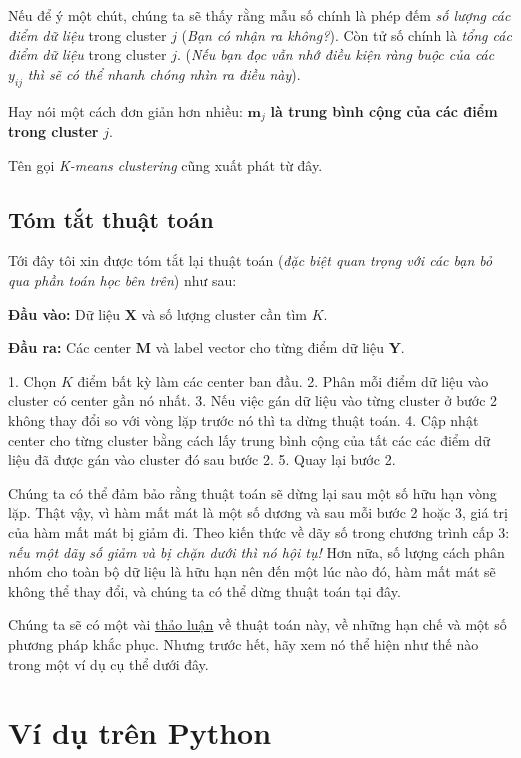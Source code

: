 Nếu để ý một chút, chúng ta sẽ thấy rằng mẫu số chính là phép đếm \textit{số lượng các điểm dữ liệu} trong cluster $j$ (\textit{Bạn có nhận ra không?}). Còn tử số chính là \textit{tổng các điểm dữ liệu} trong cluster $j$. (\textit{Nếu bạn đọc vẫn nhớ điều kiện ràng buộc của các} $y_{ij} $ \textit{thì sẽ có thể nhanh chóng nhìn ra điều này}). 
 
Hay nói một cách đơn giản hơn nhiều: $\mathbf{m}_j$ \textbf{là trung bình cộng của các điểm trong cluster} $j$. 
 
Tên gọi \textit{K-means clustering} cũng xuất phát từ đây. 
 
\subsection{Tóm tắt thuật toán}
Tới đây tôi xin được tóm tắt lại thuật toán (\textit{đặc biệt quan trọng với các bạn bỏ qua phần toán học bên trên}) như sau: 
 
\textbf{Đầu vào:} Dữ liệu $\mathbf{X}$ và số lượng cluster cần tìm $K$. 
 
\textbf{Đầu ra:} Các center $\mathbf{M}$ và label vector cho từng điểm dữ liệu $\mathbf{Y}$. 
 
1. Chọn $K$ điểm bất kỳ làm các center ban đầu. 
2. Phân mỗi điểm dữ liệu vào cluster có center gần nó nhất.  
3. Nếu việc gán dữ liệu vào từng cluster ở bước 2 không thay đổi so với vòng lặp trước nó thì ta dừng thuật toán.  
4. Cập nhật center cho từng cluster bằng cách lấy trung bình cộng của tất các các điểm dữ liệu đã được gán vào cluster đó sau bước 2. 
5. Quay lại bước 2. 
 
Chúng ta có thể đảm bảo rằng thuật toán sẽ dừng lại sau một số hữu hạn vòng lặp. Thật vậy, vì hàm mất mát là một số dương và sau mỗi bước 2 hoặc 3, giá trị của hàm mất mát bị giảm đi. Theo kiến thức về dãy số trong chương trình cấp 3: \textit{nếu một dãy số giảm và bị chặn dưới thì nó hội tụ!} Hơn nữa, số lượng cách phân nhóm cho toàn bộ dữ liệu là hữu hạn nên đến một lúc nào đó, hàm mất mát sẽ không thể thay đổi, và chúng ta có thể dừng thuật toán tại đây. 
 
Chúng ta sẽ có một vài \href{http://machinelearningcoban.com#-thao-luan}{thảo luận} về thuật toán này, về những hạn chế và một số phương pháp khắc phục. Nhưng trước hết, hãy xem nó thể hiện như thế nào trong một ví dụ cụ thể dưới đây. 
 
 
\section{Ví dụ trên Python}
 
